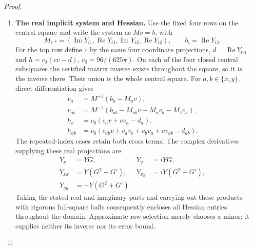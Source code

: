 \begin{proof}
\begin{enumerate}[label={$\langle1\rangle$\arabic*.}]
\begin{enumerate}[label={$\langle2\rangle$\arabic*.},leftmargin=*]
\item \textbf{The real implicit system and Hessian.}
Use the fixed four rows on the central square and
write the system as $Mv=b$, with
\[
 M_{i,*}=(\operatorname{Im}Y_{i1},\operatorname{Re}Y_{i1},
          \operatorname{Im}Y_{i2},\operatorname{Re}Y_{i2}),
 \qquad b_i=\operatorname{Re}Y_{i3}.
\]
For the top row define $c$ by the same four coordinate projections,
$d=\operatorname{Re}Y_{03}$ and $h=c_0(cv-d)$,
$c_0=96/(625\pi)$. On each of the four closed central subsquares the certified
matrix inverse exists throughout the square, so it is the inverse there. Their union is the whole central square.
For $a,b\in\{x,y\}$, direct differentiation gives
\[
 \begin{split}
 v_a&=M^{-1}(b_a-M_av),\\
 v_{ab}&=M^{-1}(b_{ab}-M_{ab}v-M_av_b-M_bv_a),\\
 h_a&=c_0(c_av+cv_a-d_a),\\
 h_{ab}&=c_0(c_{ab}v+c_av_b+c_bv_a+cv_{ab}-d_{ab}).
 \end{split}
\]
The repeated-index cases retain both cross terms. The complex derivatives supplying these real projections are
\[
 \begin{aligned}
 Y_x&=YG,& Y_y&=iYG,\\
 Y_{xx}&=Y(G^2+G'),& Y_{xy}&=iY(G^2+G'),\\
 Y_{yy}&=-Y(G^2+G').
 \end{aligned}
\]
Taking the stated real and imaginary parts and carrying out these
products with rigorous full-square balls consequently encloses
all Hessian entries throughout the domain. Approximate row
selection merely chooses a minor; it supplies neither its inverse
nor its error bound.


\end{enumerate}


\end{enumerate}
\end{proof}
